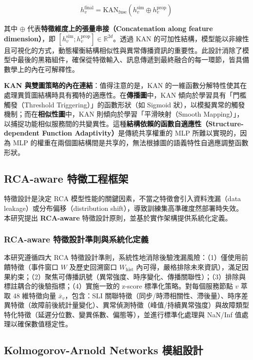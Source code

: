 \documentclass[10pt,a4paper,twocolumn]{article}
\begin{document}
\begin{equation}
h_v^{\text{final}} = \text{KAN}_{\text{fuse}}\left( h_v^{\text{sim}} \oplus h_v^{\text{prop}} \right)
\end{equation}

其中 $\oplus$ 代表\textbf{特徵維度上的張量串接（Concatenation along feature dimension）}，即 $[h_v^{\text{sim}}; h_v^{\text{prop}}] \in \mathbb{R}^{2d}$。透過 KAN 的可加性結構，模型能以非線性且可視化的方式，動態權衡結構相似性與異常傳播資訊的重要性。此設計消除了模型中最後的黑箱組件，確保從特徵輸入、訊息傳遞到最終融合的每一環節，皆具備數學上的內在可解釋性。

\textbf{KAN 與雙圖策略的內在連結}：值得注意的是，KAN 的一維函數分解特性使其在處理異質圖結構時具有獨特的適應性。在\textbf{傳播圖}中，KAN 傾向於學習具有「門檻觸發（Threshold Triggering）」的函數形狀（如 Sigmoid 狀），以模擬異常的觸發機制；而在\textbf{相似性圖}中，KAN 則傾向於學習「平滑映射（Smooth Mapping）」，以捕捉功能相似服務間的共變異性。這種\textbf{結構依賴的函數自適應性（Structure-dependent Function Adaptivity）}是傳統共享權重的 MLP 所難以實現的，因為 MLP 的權重在兩個圖結構間是共享的，無法根據圖的語義特性自適應調整函數形狀。

\subsection{RCA-aware 特徵工程框架}

特徵設計是決定 RCA 模型性能的關鍵因素，不當之特徵會引入資料洩漏（data leakage）或分布偏移（distribution shift），導致訓練集高準確度然部署時失效。本研究提出 \textbf{RCA-aware} 特徵設計原則，並基於實作架構提供系統化定義。

\subsubsection{RCA-aware 特徵設計準則與系統化定義}

本研究遵循四大 RCA 特徵設計準則，系統性地消除後驗洩漏風險：（1）僅使用前饋特徵（事件窗口 $W$ 及歷史回溯窗口 $W_{\text{hist}}$ 內可得，嚴格排除未來資訊），滿足因果約束；（2）聚焦可傳播訊號（異常強度、時序變化、傳播關聯性）；（3）排除與標註耦合的後驗指標；（4）實施一致的 z-score 標準化策略。對每個服務節點 $v$ 萃取 48 維特徵向量 $\bar{x}_v$，包含：SLI 關聯特徵（同步/時滯相關性、滯後量）、時序差異特徵（故障前後統計量變化）、異常偵測特徵（峰值/持續異常強度）與故障類型特化特徵（延遲分位數、變異係數、偏態等），並進行標準化處理與 NaN/Inf 值處理以確保數值穩定性。

\subsection{Kolmogorov-Arnold Networks 模組設計}
\end{document}
